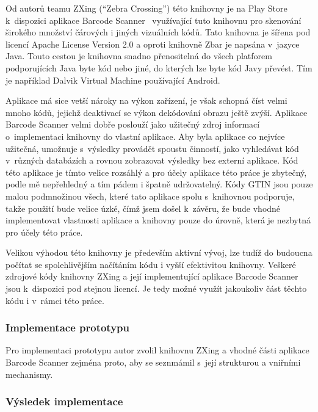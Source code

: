 \documentclass[thesis=B,czech]{FITthesis}[2013/10/20]
\begin{document}
Od autorů teamu ZXing (``Zebra Crossing'') této knihovny je na Play Store k~dispozici aplikace Barcode Scanner~\cite{barcode_scanner} využívající tuto knihovnu pro skenování širokého množství čárových i jiných vizuálních kódů. Tato knihovna je šířena pod licencí Apache License Version 2.0 a oproti knihovně Zbar je napsána v~jazyce Java. Touto cestou je knihovna snadno přenositelná do všech platforem podporujících Java byte kód nebo jiné, do kterých lze byte kód Javy převést. Tím je například Dalvik Virtual Machine používající Android.

Aplikace má sice vetší nároky na výkon zařízení, je však schopná číst velmi mnoho kódů, jejichž deaktivací se výkon dekódování obrazu ještě zvýší. Aplikace Barcode Scanner velmi dobře poslouží jako užitečný zdroj informací o~implementaci knihovny do vlastní aplikace. Aby byla aplikace co nejvíce užitečná, umožnuje s~výsledky provádět spoustu činností, jako vyhledávat kód v~různých databázích a rovnou zobrazovat výsledky bez externí aplikace. Kód této aplikace je tímto velice rozsáhlý a pro účely aplikace této práce je zbytečný, podle mě nepřehledný a tím pádem i špatně udržovatelný. Kódy GTIN jsou pouze malou podmnožinou všech, které tato aplikace spolu s~knihovnou podporuje, takže použití bude velice úzké, čímž jsem došel k~závěru, že bude vhodné implementovat vlastnosti aplikace a knihovny pouze do úrovně, která je nezbytná pro účely této práce.

Velikou výhodou této knihovny je především aktivní vývoj, lze tudíž do budoucna počítat se spolehlivějším načítáním kódu i vyšší efektivitou knihovny. Veškeré zdrojové kódy knihovny ZXing a její implementující aplikace Barcode Scanner jsou k~dispozici pod stejnou licencí. Je tedy možné využít jakoukoliv část těchto kódu i v~rámci této práce. 

\subsubsection{Implementace prototypu}

Pro implementaci prototypu autor zvolil knihovnu ZXing a vhodné části aplikace Barcode Scanner zejména proto, aby se seznmámil s~její strukturou a vniřními mechanismy. 

\subsubsection{Výsledek implementace}
\end{document}
